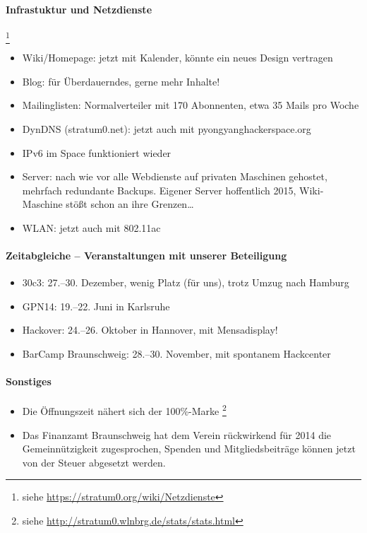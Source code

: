 \documentclass[a4paper,12pt]{scrartcl}
\begin{document}
\paragraph{Infrastuktur und Netzdienste}\hspace{-2ex}\footnote{siehe
\url{https://stratum0.org/wiki/Netzdienste}}
\begin{itemize}
  \item Wiki/Homepage: jetzt mit Kalender, könnte ein neues Design vertragen
  \item Blog: für Überdauerndes, gerne mehr Inhalte!
  \item Mailinglisten: Normalverteiler mit 170 Abonnenten, etwa 35 Mails pro
    Woche
  \item DynDNS (stratum0.net): jetzt auch mit pyongyanghackerspace.org
  \item IPv6 im Space funktioniert wieder
  \item Server: nach wie vor alle Webdienste auf privaten Maschinen gehostet,
    mehrfach redundante Backups. Eigener Server hoffentlich 2015, Wiki-Maschine
    stößt schon an ihre Grenzen\ldots
  \item WLAN: jetzt auch mit 802.11ac
  \end{itemize}

\paragraph{Zeitabgleiche -- Veranstaltungen mit unserer Beteiligung}
\begin{itemize}
  \item 30c3: 27.--30. Dezember, wenig Platz (für uns), trotz Umzug nach Hamburg
  \item GPN14: 19.--22. Juni in Karlsruhe
  \item Hackover: 24.--26. Oktober in Hannover, mit Mensadisplay!
  \item BarCamp Braunschweig: 28.--30. November, mit spontanem Hackcenter
\end{itemize}

\paragraph{Sonstiges}
\begin{itemize}
  \item Die Öffnungszeit nähert sich der 100\%-Marke
    \footnote{siehe \url{http://stratum0.wlnbrg.de/stats/stats.html}}
  \item Das Finanzamt Braunschweig hat dem Verein rückwirkend für 2014 die
    Gemeinnützigkeit zugesprochen, Spenden und Mitgliedsbeiträge können jetzt
    von der Steuer abgesetzt werden.
\end{itemize}
\end{document}
